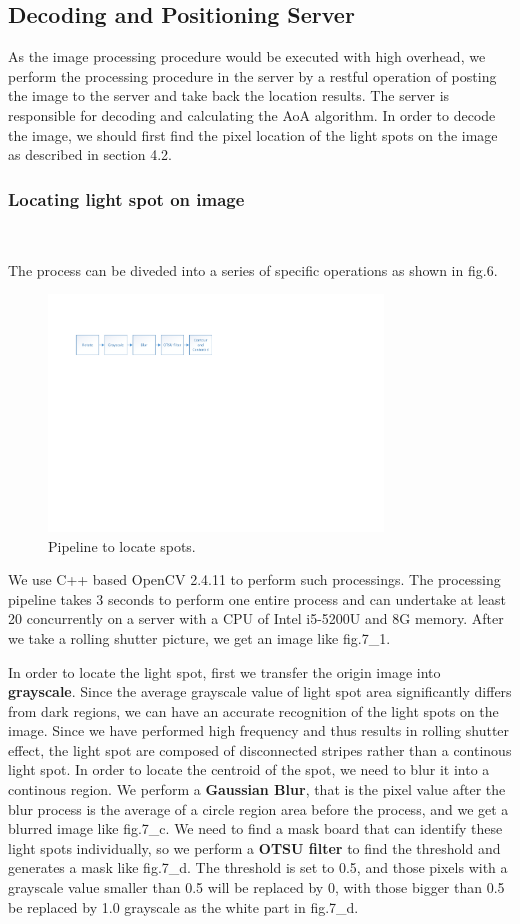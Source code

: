 \documentclass[conference]{IEEEtran}
\begin{document}
\subsection{\textbf{Decoding and Positioning Server}}
As the image processing procedure would be executed with high overhead, we perform the processing procedure in the server by a restful operation of posting the image to the server and take back the location results. The server is responsible for decoding and calculating the AoA algorithm. In order to decode the image, we should first find the pixel location of the light spots on the image as described in section 4.2. 
\subsubsection{\textbf{Locating light spot on image}} \ 

The process can be diveded into a series of specific operations as shown in fig.6.
	\begin{figure}
		\centering
		\includegraphics[width=3.5in]{../img.origin/fig6.pdf}
		\caption{Pipeline to locate spots.}
		\label{fig_6}
	\end{figure}
We use C++ based OpenCV 2.4.11 to perform such processings. The processing pipeline takes 3 seconds to perform one entire process  and can undertake at least 20 concurrently on a server with a CPU of Intel i5-5200U and 8G memory.  
After we take a rolling shutter picture, we get an image like fig.7\_1. \

In order to locate the light spot, first we transfer the origin image into \textbf{grayscale}. Since the average grayscale value of light spot area significantly differs from dark regions, we can have an accurate recognition of the light spots on the image. Since we have performed high frequency and thus results in rolling shutter effect, the light spot are composed of disconnected stripes rather than a continous light spot. In order to locate the centroid of the spot, we need to blur it into a continous region. We perform a \textbf{Gaussian Blur}, that is the pixel value after the blur process is the average of a circle region area before the process, and we get a blurred image like fig.7\_c. We need to find a mask board that can identify these light spots individually, so we perform a \textbf{OTSU filter} to find the threshold and generates a mask like fig.7\_d. The threshold is set to 0.5, and those pixels with a grayscale value smaller than 0.5 will be replaced by 0, with those bigger than 0.5 be replaced by 1.0 grayscale as the white part in fig.7\_d. \ 
\end{document}
